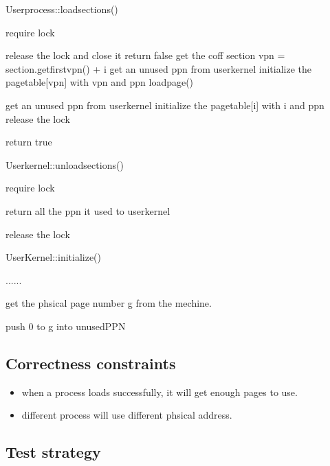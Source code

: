 \documentclass[a4paper,10pt]{article}
\begin{document}
\begin{algorithm}
\caption{Userprocess::loadsections()}
require lock\;

      {
           release the lock and close it\;
           return false\;
      }
{
     get the coff section\;
     {
         vpn = section.getfirstvpn() + i\;
         get an unused ppn from userkernel\;
         initialize the pagetable[vpn] with vpn and ppn\;
         loadpage()\;
     }
}

{
     {
          get an unused ppn from userkernel\;
          initialize the pagetable[i] with i and ppn\;
     }
}
release the lock\;

return true\;
\end{algorithm}

\begin{algorithm}
\caption{Userkernel::unloadsections()}
require lock\;

return all the ppn it used to userkernel\;

release the lock\;

\end{algorithm}

\begin{algorithm}
\caption{UserKernel::initialize()}

......\;

get the phsical page number g from the mechine.

push 0 to g into unusedPPN\;

\end{algorithm}


\subsection{Correctness constraints}

\begin{itemize}
\item when a process loads successfully, it will get enough pages to use.
\item different process will use different phsical address.
\end{itemize}


\subsection{Test strategy}
\end{document}
